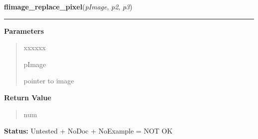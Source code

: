\hspace{.8\funcindent}\begin{boxedminipage}{\funcwidth}

    \raggedright \textbf{flimage\_replace\_pixel}(\textit{pImage}, \textit{p2}, \textit{p3})

    \vspace{-1.5ex}

    \rule{\textwidth}{0.5\fboxrule}
\setlength{\parskip}{2ex}
\setlength{\parskip}{1ex}
      \textbf{Parameters}
      \vspace{-1ex}

      \begin{quote}
        \begin{Ventry}{xxxxxx}

          \item[pImage]

          pointer to image

        \end{Ventry}

      \end{quote}

      \textbf{Return Value}
    \vspace{-1ex}

      \begin{quote}
      num

      \end{quote}

\textbf{Status:} Untested + NoDoc + NoExample = NOT OK



    \end{boxedminipage}

    \label{xformslib:library:flimage_transform_pixels}

    \vspace{0.5ex}

